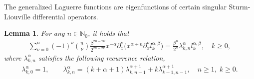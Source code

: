 \documentclass[10pt,reqno]{amsart}
\newtheorem{lmm}{\bf Lemma}
\theoremstyle{remark}
\theoremstyle{definition}
\begin{document}
The generalized Laguerre functions are eigenfunctions of certain singular Sturm-Liouville differential  operators.
\begin{lmm} For any $n\in \mathbb{N}_0$, it holds that
\label{GLFeigen}
\begin{align}
\label{2.20s}
  \sum_{\nu=0}^{n}(-1)^{\nu} \binom{n}{\nu}  \frac{\beta^{2n-2\nu}}{2^{2n-2\nu}} x^{-\alpha} \partial_x^{\nu}
  \Big( x^{\alpha+n} \partial_x^{\nu} l^{\alpha,\beta}_k  \Big) =
 \frac{\beta^{n}}{2^{n}}     \lambda_{k,n}^{\alpha}  l^{\alpha,\beta}_k,
  \quad k\ge 0,
\end{align}
where  $ \lambda^{\alpha}_{k,n}$ satisfies the following recurrence relation,
 \begin{align}
 \label{eigenInduct}
 \lambda^{\alpha}_{k,0}=1,\qquad
 \lambda^{\alpha}_{k,n}= (k+\alpha+1)  \lambda^{\alpha+1}_{k,n-1}
 +k  \lambda^{\alpha+1}_{k-1,n-1}, \quad n\ge 1, \; k\ge 0.
 \end{align}
 \end{lmm}
\end{document}
